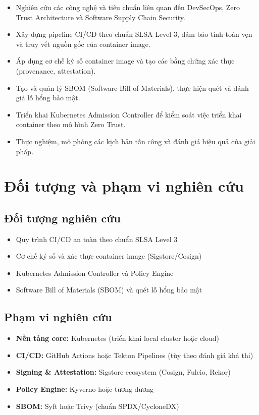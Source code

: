 \begin{itemize}
    \item Nghiên cứu các công nghệ và tiêu chuẩn liên quan đến DevSecOps, Zero Trust Architecture và Software Supply Chain Security.
    \item Xây dựng pipeline CI/CD theo chuẩn SLSA Level 3, đảm bảo tính toàn vẹn và truy vết nguồn gốc của container image.
    \item Áp dụng cơ chế ký số container image và tạo các bằng chứng xác thực (provenance, attestation).
    \item Tạo và quản lý SBOM (Software Bill of Materials), thực hiện quét và đánh giá lỗ hổng bảo mật.
    \item Triển khai Kubernetes Admission Controller để kiểm soát việc triển khai container theo mô hình Zero Trust.
    \item Thực nghiệm, mô phỏng các kịch bản tấn công và đánh giá hiệu quả của giải pháp.
\end{itemize}

\section{Đối tượng và phạm vi nghiên cứu}

\subsection{Đối tượng nghiên cứu}
\begin{itemize}
    \item Quy trình CI/CD an toàn theo chuẩn SLSA Level 3
    \item Cơ chế ký số và xác thực container image (Sigstore/Cosign)
    \item Kubernetes Admission Controller và Policy Engine
    \item Software Bill of Materials (SBOM) và quét lỗ hổng bảo mật
\end{itemize}

\subsection{Phạm vi nghiên cứu}
\begin{itemize}
    \item \textbf{Nền tảng core:} Kubernetes (triển khai local cluster hoặc cloud)
    \item \textbf{CI/CD:} GitHub Actions hoặc Tekton Pipelines (tùy theo đánh giá khả thi)
    \item \textbf{Signing \& Attestation:} Sigstore ecosystem (Cosign, Fulcio, Rekor)
    \item \textbf{Policy Engine:} Kyverno hoặc tương đương
    \item \textbf{SBOM:} Syft hoặc Trivy (chuẩn SPDX/CycloneDX)
\end{itemize}

